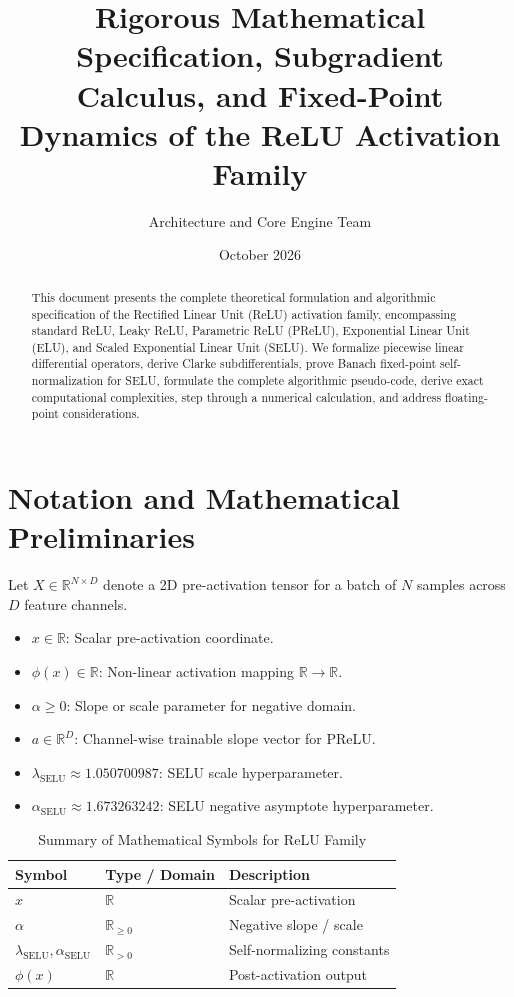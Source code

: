 \documentclass[11pt,a4paper]{article}
\title{\textbf{Rigorous Mathematical Specification, Subgradient Calculus, and Fixed-Point Dynamics of the ReLU Activation Family}}
\author{Architecture and Core Engine Team}
\date{October 2026}
\theoremstyle{definition}
\begin{document}
\maketitle

\begin{abstract}
This document presents the complete theoretical formulation and algorithmic specification of the Rectified Linear Unit (ReLU) activation family, encompassing standard ReLU, Leaky ReLU, Parametric ReLU (PReLU), Exponential Linear Unit (ELU), and Scaled Exponential Linear Unit (SELU). We formalize piecewise linear differential operators, derive Clarke subdifferentials, prove Banach fixed-point self-normalization for SELU, formulate the complete algorithmic pseudo-code, derive exact computational complexities, step through a numerical calculation, and address floating-point considerations.
\end{abstract}

\section{Notation and Mathematical Preliminaries}

Let $X \in \mathbb{R}^{N \times D}$ denote a 2D pre-activation tensor for a batch of $N$ samples across $D$ feature channels.

\begin{itemize}
    \item $x \in \mathbb{R}$: Scalar pre-activation coordinate.
    \item $\phi(x) \in \mathbb{R}$: Non-linear activation mapping $\mathbb{R} \to \mathbb{R}$.
    \item $\alpha \ge 0$: Slope or scale parameter for negative domain.
    \item $a \in \mathbb{R}^D$: Channel-wise trainable slope vector for PReLU.
    \item $\lambda_{\text{SELU}} \approx 1.050700987$: SELU scale hyperparameter.
    \item $\alpha_{\text{SELU}} \approx 1.673263242$: SELU negative asymptote hyperparameter.
\end{itemize}

\begin{table}[h]
\centering
\caption{Summary of Mathematical Symbols for ReLU Family}
\begin{tabular}{lll}
\toprule
\textbf{Symbol} & \textbf{Type / Domain} & \textbf{Description} \\
\midrule
$x$ & $\mathbb{R}$ & Scalar pre-activation \\
$\alpha$ & $\mathbb{R}_{\ge 0}$ & Negative slope / scale \\
$\lambda_{\text{SELU}}, \alpha_{\text{SELU}}$ & $\mathbb{R}_{> 0}$ & Self-normalizing constants \\
$\phi(x)$ & $\mathbb{R}$ & Post-activation output \\
\bottomrule
\end{tabular}
\end{table}
\end{document}
